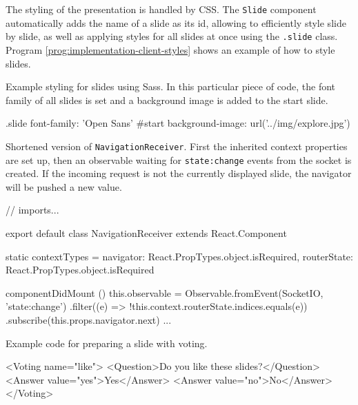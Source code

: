 The styling of the presentation is handled by CSS. The \texttt{Slide} component automatically adds the name of a slide as its id, allowing to efficiently style slide by slide, as well as applying styles for all slides at once using the \texttt{.slide} class. Program \ref{prog:implementation-client-styles} shows an example of how to style slides.

\begin{program}
\caption{Example styling for slides using Sass. In this particular piece of code, the font family of all slides is set and a background image is added to the start slide.}
\label{prog:implementation-client-styles}
\begin{CssCode}
  .slide
    font-family: 'Open Sans'
  #start
    background-image: url('../img/explore.jpg')
\end{CssCode}
\end{program}

\begin{program}
\caption{Shortened version of \texttt{NavigationReceiver}. First the inherited context properties are set up, then an observable waiting for \texttt{state:change} events from the socket is created. If the incoming request is not the currently displayed slide, the navigator will be pushed a new value.}
\label{prog:usage-network-sync-navigation-receiver}
\begin{JsCode}
// imports...

export default class NavigationReceiver extends React.Component {
  static contextTypes = {
    navigator:   React.PropTypes.object.isRequired,
    routerState: React.PropTypes.object.isRequired
  }

  componentDidMount () {
    this.observable = Observable.fromEvent(SocketIO, 'state:change')
      .filter((e) => !this.context.routerState.indices.equals(e))
      .subscribe(this.props.navigator.next)
  }
  ...
}
\end{JsCode}
\end{program}
%

\begin{program}
\caption{Example code for preparing a slide with voting.}
\label{prog:implementation-interactive-structure}
\begin{JsCode}
<Voting name="like">
  <Question>Do you like these slides?</Question>
  <Answer value="yes">Yes</Answer>
  <Answer value="no">No</Answer>
</Voting>
\end{JsCode}
\end{program}